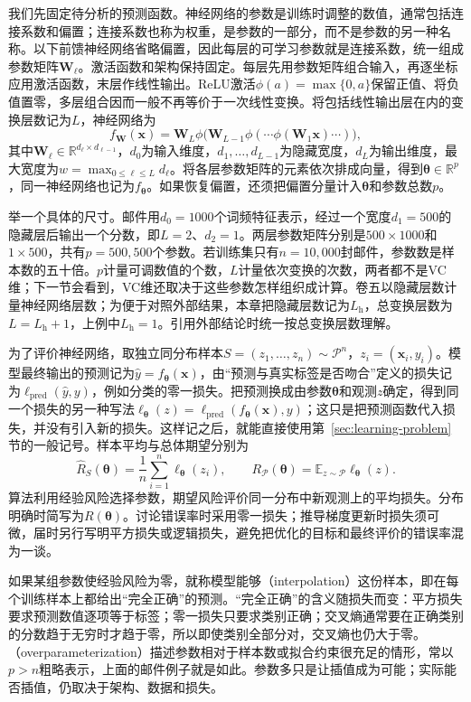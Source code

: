 我们先固定待分析的预测函数。神经网络的参数是训练时调整的数值，通常包括连接系数和偏置；连接系数也称为权重，是参数的一部分，而不是参数的另一种名称。以下前馈神经网络省略偏置，因此每层的可学习参数就是连接系数，统一组成参数矩阵$\bm W_\ell$。激活函数和架构保持固定。每层先用参数矩阵组合输入，再逐坐标应用激活函数，末层作线性输出。ReLU激活$\phi(a)=\max\{0,a\}$保留正值、将负值置零，多层组合因而一般不再等价于一次线性变换。将包括线性输出层在内的变换层数记为$L$，神经网络为
\begin{equation}
 f_{\bm W}(\bm x)=\bm W_L\phi\bigl(\bm W_{L-1}\phi(\cdots\phi(\bm W_1\bm x)\cdots)\bigr),
 \label{eq:feedforward-network}
\end{equation}
其中$\bm W_\ell\in\mathbb R^{d_\ell\times d_{\ell-1}}$，$d_0$为输入维度，$d_1,\ldots,d_{L-1}$为隐藏宽度，$d_L$为输出维度，最大宽度为$w=\max_{0\leq\ell\leq L}d_\ell$。将各层参数矩阵的元素依次排成向量，得到$\bm\theta\in\mathbb R^p$，同一神经网络也记为$f_{\bm\theta}$。如果恢复偏置，还须把偏置分量计入$\bm\theta$和参数总数$p$。

举一个具体的尺寸。邮件用$d_0=1000$个词频特征表示，经过一个宽度$d_1=500$的隐藏层后输出一个分数，即$L=2$、$d_2=1$。两层参数矩阵分别是$500\times1000$和$1\times500$，共有$p=500{,}500$个参数。若训练集只有$n=10{,}000$封邮件，参数数是样本数的五十倍。$p$计量可调数值的个数，$L$计量依次变换的次数，两者都不是VC维；下一节会看到，VC维还取决于这些参数怎样组织成计算。卷五以隐藏层数计量神经网络层数；为便于对照外部结果，本章把隐藏层数记为$L_{\mathrm h}$，总变换层数为$L=L_{\mathrm h}+1$，上例中$L_{\mathrm h}=1$。引用外部结论时统一按总变换层数理解。

为了评价神经网络，取独立同分布样本$S=(z_1,\ldots,z_n)\sim\mathcal P^n$，$z_i=(\bm x_i,y_i)$。模型最终输出的预测记为$\widehat y=f_{\bm\theta}(\bm x)$，由“预测与真实标签是否吻合”定义的损失记为$\ell_{\mathrm{pred}}(\widehat y,y)$，例如分类的零一损失。把预测换成由参数$\bm\theta$和观测$z$确定，得到同一个损失的另一种写法$\ell_{\bm\theta}(z)=\ell_{\mathrm{pred}}(f_{\bm\theta}(\bm x),y)$；这只是把预测函数代入损失，并没有引入新的损失。这样记之后，就能直接使用第~\ref{sec:learning-problem}节的一般记号。样本平均与总体期望分别为
\[
 \hat R_S(\bm\theta)=\frac1n\sum_{i=1}^n\ell_{\bm\theta}(z_i),
 \qquad
 R_{\mathcal P}(\bm\theta)=\mathbb E_{z\sim\mathcal P}\ell_{\bm\theta}(z).
\]
算法利用经验风险选择参数，期望风险评价同一分布中新观测上的平均损失。分布明确时简写为$R(\bm\theta)$。讨论错误率时采用零一损失；推导梯度更新时损失须可微，届时另行写明平方损失或逻辑损失，避免把优化的目标和最终评价的错误率混为一谈。

如果某组参数使经验风险为零，就称模型能够（interpolation）这份样本，即在每个训练样本上都给出“完全正确”的预测。“完全正确”的含义随损失而变：平方损失要求预测数值逐项等于标签；零一损失只要求类别正确；交叉熵通常要在正确类别的分数趋于无穷时才趋于零，所以即使类别全部分对，交叉熵也仍大于零。（overparameterization）描述参数相对于样本数或拟合约束很充足的情形，常以$p>n$粗略表示，上面的邮件例子就是如此。参数多只是让插值成为可能；实际能否插值，仍取决于架构、数据和损失。

